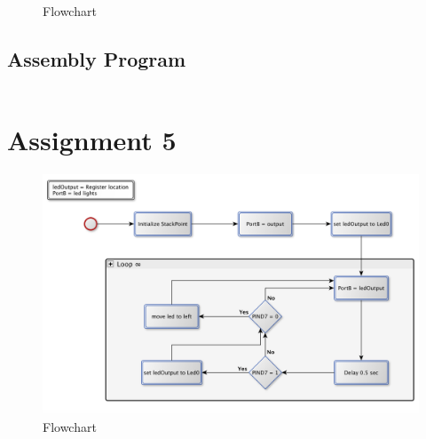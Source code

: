 \documentclass[a4paper, 12pt]{article}
\begin{document}
\begin{figure}[h]

\caption{Flowchart}
\label{}
\end{figure}

\subsection{Assembly Program}
\begin{lstlisting}

\end{lstlisting}
\newpage

\section{Assignment 5}
\begin{algorithm}
\begin{algorithmic}
 
\Repeat
{}
\EndIf
{}
\EndIf
\Until{$\infty$}
\EndProcedure
\caption{}
\label{}
\end{algorithmic}
\end{algorithm}

\begin{figure}[h]
\includegraphics[scale=0.5]{Flowchart_pics/assignment5_pic.png} 
\caption{Flowchart}
\label{}
\end{figure}
\newpage
\end{document}

